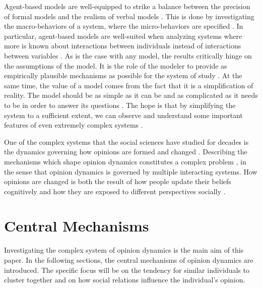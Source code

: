 \documentclass[11pt]{article}
\begin{document}
Agent-based models are well-equipped to strike a balance between the precision of formal models and the realism of verbal models \cite{flache_between_2018,galesic_integrating_2021,epstein1999agent,mas2014cultural}. This is done by investigating the macro-behaviors of a system, where the micro-behaviors are specified \cite{bruch_agent-based_2015,epstein1999agent,flache_between_2018}. In particular, agent-based models are well-suited when analyzing systems where more is known about interactions between individuals instead of interactions between variables \cite{geschke2019triple}. As is the case with any model, the results critically hinge on the assumptions of the model. It is the role of the modeler to provide as empirically plausible mechanisms as possible for the system of study \cite{crooks2012introduction,epstein1999agent,page2010diversity}. At the same time, the value of a model comes from the fact that it is a simplification of reality. The model should be as simple as it can be and as complicated as it needs to be in order to answer its questions \cite{smaldino_how_2020}. The hope is that by simplifying the system to a sufficient extent, we can observe and understand some important features of even extremely complex systems \cite{fogarty_ten_2022,smaldino_models_2016, smaldino_how_2020, smaldino_models_2022}.

\noindent One of the complex systems that the social sciences have studied for decades is the dynamics governing how opinions are formed and changed \cite{flache_models_2017}. Describing the mechanisms which shape opinion dynamics constitutes a complex problem \cite{mas2019challenges}, in the sense that opinion dynamics is governed by multiple interacting systems. 
How opinions are changed is both the result of how people update their beliefs cognitively and how they are exposed to different perspectives socially \cite{friedkin_social_1990,spears_social_2021}. 

\section{Central Mechanisms}
Investigating the complex system of opinion dynamics is the main aim of this paper. In the following sections, the central mechanisms of opinion dynamics are introduced. The specific focus will be on the tendency for similar individuals to cluster together and on how social relations influence the individual's opinion. 
\end{document}
